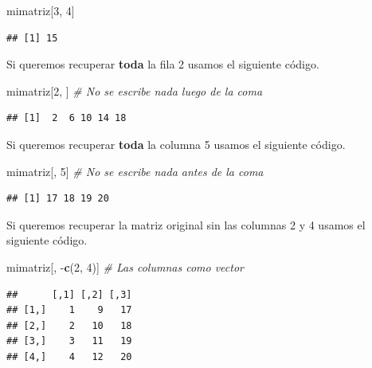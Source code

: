 \documentclass[10pt,]{krantz}
\makeatletter
\newenvironment{Shaded}{\begin{snugshade}}{\end{snugshade}}
\newcommand{\KeywordTok}[1]{\textcolor[rgb]{0.13,0.29,0.53}{\textbf{{#1}}}}
\newcommand{\DecValTok}[1]{\textcolor[rgb]{0.00,0.00,0.81}{{#1}}}
\newcommand{\CommentTok}[1]{\textcolor[rgb]{0.56,0.35,0.01}{\textit{{#1}}}}
\newcommand{\NormalTok}[1]{{#1}}
\newenvironment{kframe}{%
\medskip{}
\setlength{\fboxsep}{.8em}
 \def\at@end@of@kframe{}%
 \ifinner\ifhmode%
  \def\at@end@of@kframe{\end{minipage}}%
  \begin{minipage}{\columnwidth}%
 \fi\fi%
 \def\FrameCommand##1{\hskip\@totalleftmargin \hskip-\fboxsep
 \colorbox{shadecolor}{##1}\hskip-\fboxsep
     \hskip-\linewidth \hskip-\@totalleftmargin \hskip\columnwidth}%
 \MakeFramed {\advance\hsize-\width
   \@totalleftmargin\z@ \linewidth\hsize
   \@setminipage}}%
 {\par\unskip\endMakeFramed%
 \at@end@of@kframe}
\renewenvironment{Shaded}{\begin{kframe}}{\end{kframe}}
\makeatother
\begin{document}
\begin{Shaded}
\begin{Highlighting}[]
\NormalTok{mimatriz[}\DecValTok{3}\NormalTok{, }\DecValTok{4}\NormalTok{]}
\end{Highlighting}
\end{Shaded}

\begin{verbatim}
## [1] 15
\end{verbatim}

Si queremos recuperar \textbf{toda} la fila 2 usamos el siguiente
código.

\begin{Shaded}
\begin{Highlighting}[]
\NormalTok{mimatriz[}\DecValTok{2}\NormalTok{, ]  }\CommentTok{# No se escribe nada luego de la coma}
\end{Highlighting}
\end{Shaded}

\begin{verbatim}
## [1]  2  6 10 14 18
\end{verbatim}

Si queremos recuperar \textbf{toda} la columna 5 usamos el siguiente
código.

\begin{Shaded}
\begin{Highlighting}[]
\NormalTok{mimatriz[, }\DecValTok{5}\NormalTok{]  }\CommentTok{# No se escribe nada antes de la coma}
\end{Highlighting}
\end{Shaded}

\begin{verbatim}
## [1] 17 18 19 20
\end{verbatim}

Si queremos recuperar la matriz original sin las columnas 2 y 4 usamos
el siguiente código.

\begin{Shaded}
\begin{Highlighting}[]
\NormalTok{mimatriz[, -}\KeywordTok{c}\NormalTok{(}\DecValTok{2}\NormalTok{, }\DecValTok{4}\NormalTok{)]  }\CommentTok{# Las columnas como vector}
\end{Highlighting}
\end{Shaded}

\begin{verbatim}
##      [,1] [,2] [,3]
## [1,]    1    9   17
## [2,]    2   10   18
## [3,]    3   11   19
## [4,]    4   12   20
\end{verbatim}
\end{document}
